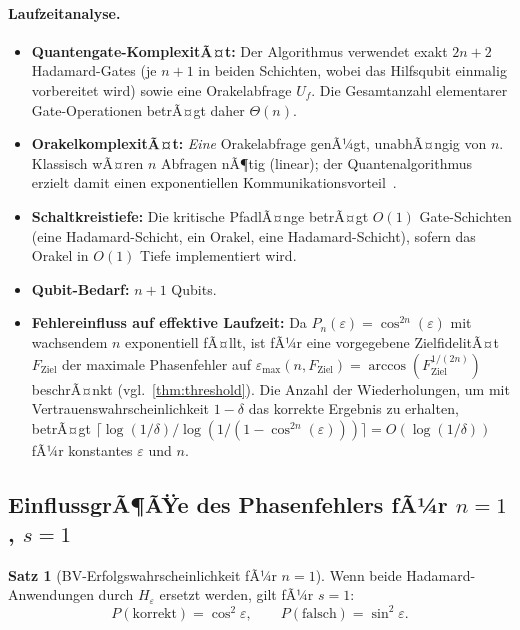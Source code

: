 ﻿\documentclass[11pt,a4paper]{article}
\theoremstyle{definition}
\newtheorem{theorem}{Satz}[section]
\newcommand{\eps}{\varepsilon}
\newcommand{\Heps}{H_{\!\varepsilon}}
\begin{document}
\paragraph{Laufzeitanalyse.}
\begin{itemize}[leftmargin=*]
  \item \textbf{Quantengate-KomplexitÃ¤t:} Der Algorithmus verwendet exakt
    $2n+2$ Hadamard-Gates (je $n+1$ in beiden Schichten, wobei das
    Hilfsqubit einmalig vorbereitet wird) sowie eine Orakelabfrage $U_f$.
    Die Gesamtanzahl elementarer Gate-Operationen betrÃ¤gt daher
    $\Theta(n)$.
  \item \textbf{OrakelkomplexitÃ¤t:} \emph{Eine} Orakelabfrage genÃ¼gt,
    unabhÃ¤ngig von $n$.  Klassisch wÃ¤ren $n$ Abfragen nÃ¶tig (linear);
    der Quantenalgorithmus erzielt damit einen exponentiellen
    Kommunikationsvorteil~\cite{BV1993}.
  \item \textbf{Schaltkreistiefe:} Die kritische PfadlÃ¤nge betrÃ¤gt $O(1)$
    Gate-Schichten (eine Hadamard-Schicht, ein Orakel, eine Hadamard-Schicht),
    sofern das Orakel in $O(1)$ Tiefe implementiert wird.
  \item \textbf{Qubit-Bedarf:} $n+1$ Qubits.
  \item \textbf{Fehlereinfluss auf effektive Laufzeit:}  Da
    $P_n(\eps)=\cos^{2n}(\eps)$ mit wachsendem $n$ exponentiell fÃ¤llt,
    ist fÃ¼r eine vorgegebene ZielfidelitÃ¤t $F_{\mathrm{Ziel}}$ der
    maximale Phasenfehler auf
    $\eps_{\max}(n,F_{\mathrm{Ziel}}) = \arccos(F_{\mathrm{Ziel}}^{1/(2n)})$
    beschrÃ¤nkt (vgl.\ \cref{thm:threshold}).  Die Anzahl der
    Wiederholungen, um mit Vertrauenswahrscheinlichkeit $1-\delta$
    das korrekte Ergebnis zu erhalten, betrÃ¤gt
    $\lceil\log(1/\delta)/\log(1/(1-\cos^{2n}(\eps)))\rceil = O(\log(1/\delta))$
    fÃ¼r konstantes $\eps$ und $n$.
\end{itemize}

\subsection{EinflussgrÃ¶ÃŸe des Phasenfehlers fÃ¼r $n=1$, $s=1$}
\label{subsec:bv_n1}

\begin{theorem}[BV-Erfolgswahrscheinlichkeit fÃ¼r $n=1$]
\label{thm:bv_n1}
  Wenn beide Hadamard-Anwendungen durch $\Heps$ ersetzt werden, gilt fÃ¼r $s=1$:
  \begin{equation}
    P(\text{korrekt}) = \cos^2\!\eps, \qquad P(\text{falsch}) = \sin^2\!\eps.
    \label{eq:bv_n1}
  \end{equation}
\end{theorem}
\end{document}
